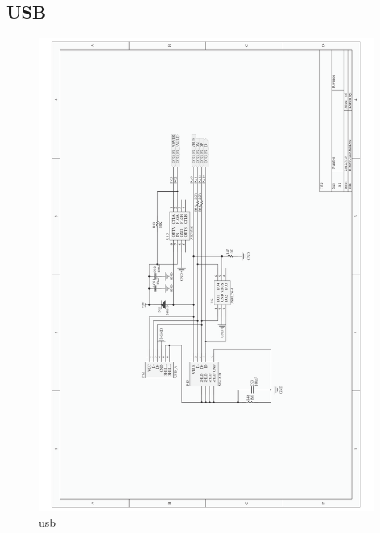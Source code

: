 \documentclass[titlepage]{article}
\begin{document}
 \subsection{USB}
 \begin{figure}[h]
  \centering
 \includegraphics[width=11cm]{usb.pdf}
 \caption{usb}
 \end{figure}

  \newpage
\end{document}
